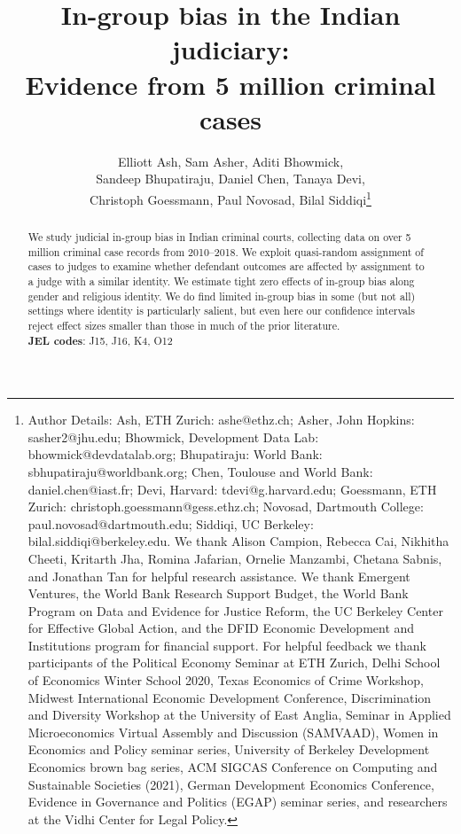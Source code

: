 \documentclass[12pt,english]{article}
\begin{document}
\title{In-group bias in the Indian judiciary: \\ Evidence from 5 million criminal cases}
\author{Elliott Ash, Sam Asher, Aditi Bhowmick, \\ 
        Sandeep Bhupatiraju, Daniel Chen, Tanaya Devi,  \\
          Christoph Goessmann, Paul Novosad, Bilal Siddiqi\thanks{Author Details: Ash, ETH Zurich: ashe@ethz.ch; Asher, John Hopkins: sasher2@jhu.edu; Bhowmick, Development Data Lab: bhowmick@devdatalab.org;  Bhupatiraju: World Bank: sbhupatiraju@worldbank.org; Chen, Toulouse and World Bank: daniel.chen@iast.fr; Devi, Harvard: tdevi@g.harvard.edu; Goessmann, ETH Zurich: christoph.goessmann@gess.ethz.ch;  Novosad, Dartmouth College: paul.novosad@dartmouth.edu; Siddiqi, UC Berkeley: bilal.siddiqi@berkeley.edu. We thank Alison Campion, Rebecca Cai, Nikhitha Cheeti, Kritarth Jha, Romina Jafarian, Ornelie Manzambi, Chetana Sabnis, and Jonathan Tan for helpful research assistance. We thank Emergent Ventures, the World Bank Research Support Budget, the World Bank Program on Data and Evidence for Justice Reform, the UC Berkeley Center for Effective Global Action, and the DFID Economic Development and Institutions program for financial support. For helpful feedback we thank participants of the Political Economy Seminar at ETH Zurich, Delhi School of Economics Winter School 2020, Texas Economics of Crime Workshop, Midwest International Economic Development Conference, Discrimination and Diversity Workshop at the University of East Anglia, Seminar in Applied Microeconomics Virtual Assembly and Discussion (SAMVAAD), Women in Economics and Policy seminar series, University of Berkeley Development Economics brown bag series, ACM SIGCAS Conference on Computing and Sustainable Societies (2021), German Development Economics Conference, Evidence in Governance and Politics (EGAP) seminar series, and researchers at the Vidhi Center for Legal Policy. }}

\maketitle

\begin{abstract}
\noindent  We study judicial in-group bias in Indian criminal courts, collecting data on over 5 million criminal case records from 2010--2018. We exploit quasi-random assignment of cases to judges to examine whether defendant outcomes are affected by assignment to a judge with a similar identity. We estimate tight zero effects of in-group bias along gender and religious identity. We do find limited in-group bias in some (but not all) settings where identity is particularly salient, but even here our confidence intervals reject effect sizes smaller than those in much of the prior literature. 
\\
\noindent \textbf{JEL codes}: J15, J16, K4, O12
\end{abstract}
\end{document}
